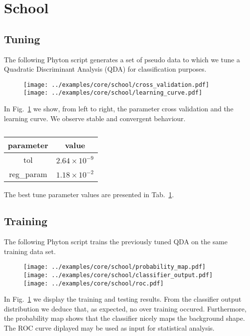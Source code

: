 
\section{School}

\subsection{Tuning}
The following Phyton script generates a set of pseudo data to which we
tune a Quadratic Discriminant Analysis (QDA) for classification
purposes.
%
\begin{changemargin}{1.5cm}{1.5cm} 
  
\end{changemargin}
%
%
\begin{figure}
  \centering
  \texttt{[image: ../examples/core/school/cross\_validation.pdf]}
  \texttt{[image: ../examples/core/school/learning\_curve.pdf]}
  \caption{}
  \label{fig:example_tuning}
\end{figure}
%
In Fig.~\ref{fig:example_tuning} we show, from left to right, the
parameter cross validation and the learning curve. We observe stable
and convergent behaviour.
%
\begin{table}[h!]
  \centering
  \begin{tabular}{c|c}
    parameter & value \\
    \hline \hline
    tol       & $2.64\times10^{-9}$ \\
    reg\_param& $1.18\times10^{-2}$\\
    \hline
    \end{tabular}
  \caption{}
  \label{tab:example_tuning}
\end{table}
%
The best tune parameter values are presented in
Tab.~\ref{tab:example_tuning}.

\subsection{Training}
The following Phyton script trains the previously tuned QDA on the
same training data set.
%
\begin{changemargin}{1.5cm}{1.5cm} 
  
\end{changemargin}
%
%
\begin{figure}
  \centering
  \texttt{[image: ../examples/core/school/probability\_map.pdf]}
  \texttt{[image: ../examples/core/school/classifier\_output.pdf]}
  \texttt{[image: ../examples/core/school/roc.pdf]}
  \caption{}
  \label{fig:example_training}
\end{figure}
%
In Fig.~\ref{fig:example_tuning} we display the training and testing
results. From the classifier output distribution we deduce that, as
expected, no over training occured. Furthermore, the probability map
shows that the classifier nicely maps the background shape. The ROC
curve diplayed may be used as input for statistical analysis.

